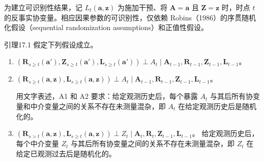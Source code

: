 为建立可识别性结果，记 $L_t(\mathbf a,\mathbf z)$ 为施加干预、将 $\mathbf A=\mathbf a$ 且 $\mathbf Z=\mathbf z$ 时，时点 $t$ 的反事实协变量。相应因果参数的可识别性，仅依赖 Robins（1986）的序贯随机化假设（sequential randomization assumptions）和正值性假设。

\begin{bookresult}{引理}{17.1}
假定下列假设成立。
\begin{enumerate}[label=A\arabic*.,leftmargin=2.8em]
 \item $(\mathbf R_{s\geq t}(\mathbf a'),\mathbf Z_{s\geq t}(\mathbf a'),\mathbf L_{s\geq t}(\mathbf a'))
 \perp A_t\mid\mathbf A_{t-1},\mathbf R_{t-1},\mathbf Z_{t-1},\mathbf L_{t-1}$。
 \item $(\mathbf R_{s\geq t}(\mathbf a,\mathbf z),\mathbf L_{s\geq t}(\mathbf a,\mathbf z))
 \perp A_t\mid\mathbf A_{t-1},\mathbf R_{t-1},\mathbf Z_{t-1},\mathbf L_{t-1}$。

 用文字表述，A1 和 A2 要求：给定观测历史后，每个暴露 $A_t$ 与其后所有协变量和中介变量之间的关系不存在未测量混杂，即 $A_t$ 在给定观测历史后是随机化的。

 \item $(\mathbf R_{s>t}(\mathbf a,\mathbf z),\mathbf L_{s\geq t}(\mathbf a,\mathbf z))
 \perp Z_t\mid\mathbf A_t,\mathbf R_t,\mathbf Z_{t-1},\mathbf L_{t-1}$。
 给定观测历史后，每个中介变量 $Z_t$ 与其后所有协变量之间的关系不存在未测量混杂，即 $Z_t$ 在给定已观测过去后是随机化的。


\end{enumerate}
\end{bookresult}
